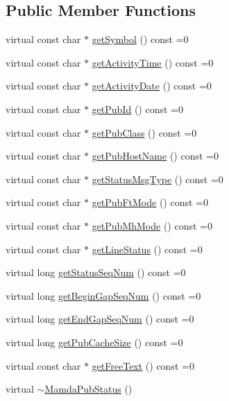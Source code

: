\subsection*{Public Member Functions}
\begin{CompactItemize}
\item 
virtual const char $\ast$ \hyperlink{classWombat_1_1MamdaPubStatus_a891a47fbe902368dbf46ab84773eff9}{get\-Symbol} () const =0
\item 
virtual const char $\ast$ \hyperlink{classWombat_1_1MamdaPubStatus_fe58ce33fc151a3cd9d64f82e27a2058}{get\-Activity\-Time} () const =0
\item 
virtual const char $\ast$ \hyperlink{classWombat_1_1MamdaPubStatus_2d1131459438c3e833583d0233c1c102}{get\-Activity\-Date} () const =0
\item 
virtual const char $\ast$ \hyperlink{classWombat_1_1MamdaPubStatus_31447dec5db0e9837e8816a03cba88e4}{get\-Pub\-Id} () const =0
\item 
virtual const char $\ast$ \hyperlink{classWombat_1_1MamdaPubStatus_ebb16e566721f6f423bf09124245c50e}{get\-Pub\-Class} () const =0
\item 
virtual const char $\ast$ \hyperlink{classWombat_1_1MamdaPubStatus_3d9fde3f554888ebb5f104c134decf60}{get\-Pub\-Host\-Name} () const =0
\item 
virtual const char $\ast$ \hyperlink{classWombat_1_1MamdaPubStatus_72d3f8a795323662c919e6f7cdd12a66}{get\-Status\-Msg\-Type} () const =0
\item 
virtual const char $\ast$ \hyperlink{classWombat_1_1MamdaPubStatus_11e1cacd11604090bf1c5387b0ac7f43}{get\-Pub\-Ft\-Mode} () const =0
\item 
virtual const char $\ast$ \hyperlink{classWombat_1_1MamdaPubStatus_e79db14a783d2831413c89f1e3c4527e}{get\-Pub\-Mh\-Mode} () const =0
\item 
virtual const char $\ast$ \hyperlink{classWombat_1_1MamdaPubStatus_553635179dab937c8ee88019f66ca0de}{get\-Line\-Status} () const =0
\item 
virtual long \hyperlink{classWombat_1_1MamdaPubStatus_d954ab6ff4df01d45ff44a616745e515}{get\-Status\-Seq\-Num} () const =0
\item 
virtual long \hyperlink{classWombat_1_1MamdaPubStatus_61827ba531d12dfb8de2e8713fd8f628}{get\-Begin\-Gap\-Seq\-Num} () const =0
\item 
virtual long \hyperlink{classWombat_1_1MamdaPubStatus_96f29e18a6b74143b81a8a523e8bbeea}{get\-End\-Gap\-Seq\-Num} () const =0
\item 
virtual long \hyperlink{classWombat_1_1MamdaPubStatus_7edfe04c5f0e4e7b5deba2f68ae47f2e}{get\-Pub\-Cache\-Size} () const =0
\item 
virtual const char $\ast$ \hyperlink{classWombat_1_1MamdaPubStatus_b64900c7cdfbf708a639036dc0251165}{get\-Free\-Text} () const =0
\item 
virtual \hyperlink{classWombat_1_1MamdaPubStatus_e176b4d51082ef05d032d36ccfa88011}{$\sim$Mamda\-Pub\-Status} ()
\end{CompactItemize}


